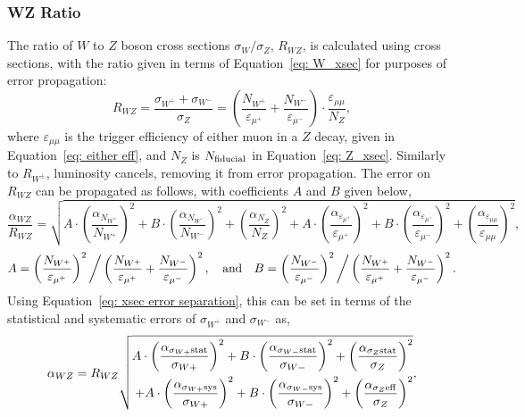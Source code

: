 \documentclass[a4paper,12pt]{article}
\begin{document}
\subsubsection{WZ Ratio}
The ratio of $W$ to $Z$ boson cross sections $\sigma_{W}/\sigma_{Z}$, $R_{WZ}$, is calculated using cross sections, with the ratio given in terms of Equation~\ref{eq: W_xsec} for purposes of error propagation:
\begin{equation}
    R_{WZ} = \frac{\sigma_{W^+} + \sigma_{W^-}}{\sigma_{Z}} = \left( \frac{N_{W^+}}{\varepsilon_{\mu^+}} + \frac{N_{W^-}}{\varepsilon_{\mu^-}} \right) \cdot \frac{\varepsilon_{\mu\mu}}{N_{Z}},
\end{equation}
where $\varepsilon_{\mu\mu}$ is the trigger efficiency of either muon in a $Z$ decay, given in Equation~\ref{eq: either eff}, and $N_Z$ is $N_{\rm fiducial}$ in Equation~\ref{eq: Z_xsec}.
Similarly to $R_{W^\pm}$, luminosity cancels, removing it from error propagation. The error on $R_{WZ}$ can be propagated as follows, with coefficients $A$ and $B$ given below,
\begin{equation}
        \frac{\alpha_{WZ}}{R_{WZ}} = \sqrt{
            A\cdot\left(\frac{\alpha_{N_{W^+}}}{N_{W^+}}\right)^2 + B\cdot\left(\frac{\alpha_{N_{W^-}}}{N_{W^-}}\right)^2 + \left(\frac{\alpha_{N_{Z}}}{N_{Z}}\right)^2 + A\cdot\left(\frac{\alpha_{\varepsilon_{\mu^+}}}{\varepsilon_{\mu^+}}\right)^2 + B\cdot\left(\frac{\alpha_{\varepsilon_{\mu^-}}}{\varepsilon_{\mu^-}}\right)^2 + \left(\frac{\alpha_{\varepsilon_{\mu\mu}}}{\varepsilon_{\mu\mu}}\right)^2
        },
\end{equation}
\begin{equation}
    A = \left(\frac{N_{W^+}}{\varepsilon_{\mu^+}}\right)^2 \bigg/ \left(\frac{N_{W^+}}{\varepsilon_{\mu^+}} + \frac{N_{W^-}}{\varepsilon_{\mu^-}}\right)^2, \quad {\rm and} \quad B = \left(\frac{N_{W^-}}{\varepsilon_{\mu^-}}\right)^2 \bigg/ \left(\frac{N_{W^+}}{\varepsilon_{\mu^+}} + \frac{N_{W^-}}{\varepsilon_{\mu^-}}\right)^2.
\end{equation}
Using Equation~\ref{eq: xsec error separation}, this can be set in terms of the statistical and systematic errors of $\sigma_{W^+}$ and $\sigma_{W^-}$ as,
\begin{equation}
        \alpha_{WZ} = R_{WZ}\sqrt{
            \begin{aligned}
                A \cdot \left(\frac{\alpha_{\sigma_{W+} \rm stat}}{\sigma_{W+}}\right)^2 + B \cdot \left(\frac{\alpha_{\sigma_{W-}\rm stat}}{\sigma_{W-}}\right)^2 + \left(\frac{\alpha_{\sigma_{Z}\rm stat}}{\sigma_Z}\right)^2 \\
                + A \cdot \left(\frac{\alpha_{\sigma_{W+} \rm sys}}{\sigma_{W+}}\right)^2 + B \cdot \left(\frac{\alpha_{\sigma_{W-}\rm sys}}{\sigma_{W-}}\right)^2 + \left(\frac{\alpha_{\sigma_{Z}\rm eff}}{\sigma_Z}\right)^2 \\
            \end{aligned}
        },
        \label{eq: WZ errors}
\end{equation}
\end{document}
